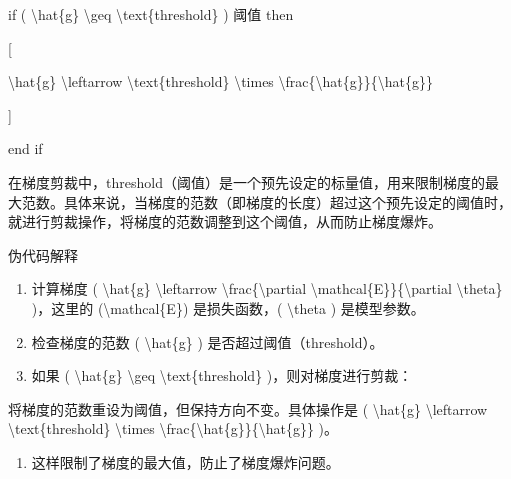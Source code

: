 
if ( \textbar{}\textbackslash hat\{g\}\textbar{} \textbackslash geq
\textbackslash text\{threshold\} )
阈值 then

{[}

\textbackslash hat\{g\} \textbackslash leftarrow
\textbackslash text\{threshold\} \textbackslash times
\textbackslash frac\{\textbackslash hat\{g\}\}\{\textbar{}\textbackslash hat\{g\}\textbar{}\}

{]}


end if

在梯度剪裁中，threshold（阈值）是一个预先设定的标量值，用来限制梯度的最大范数。具体来说，当梯度的范数（即梯度的长度）超过这个预先设定的阈值时，就进行剪裁操作，将梯度的范数调整到这个阈值，从而防止梯度爆炸。

伪代码解释

\begin{enumerate}
\def\labelenumi{\arabic{enumi}.}
\item
  计算梯度 ( \textbackslash hat\{g\} \textbackslash leftarrow
  \textbackslash frac\{\textbackslash partial
  \textbackslash mathcal\{E\}\}\{\textbackslash partial
  \textbackslash theta\} )，这里的 (\textbackslash mathcal\{E\})
  是损失函数，( \textbackslash theta ) 是模型参数。
\item
  检查梯度的范数 ( \textbar{}\textbackslash hat\{g\}\textbar{} )
  是否超过阈值（threshold）。
\item
  如果 ( \textbar{}\textbackslash hat\{g\}\textbar{} \textbackslash geq
  \textbackslash text\{threshold\} )，则对梯度进行剪裁：
\end{enumerate}

将梯度的范数重设为阈值，但保持方向不变。具体操作是 (
\textbackslash hat\{g\} \textbackslash leftarrow
\textbackslash text\{threshold\} \textbackslash times
\textbackslash frac\{\textbackslash hat\{g\}\}\{\textbar{}\textbackslash hat\{g\}\textbar{}\}
)。

\begin{enumerate}
\def\labelenumi{\arabic{enumi}.}
\item
  这样限制了梯度的最大值，防止了梯度爆炸问题。
\end{enumerate}

